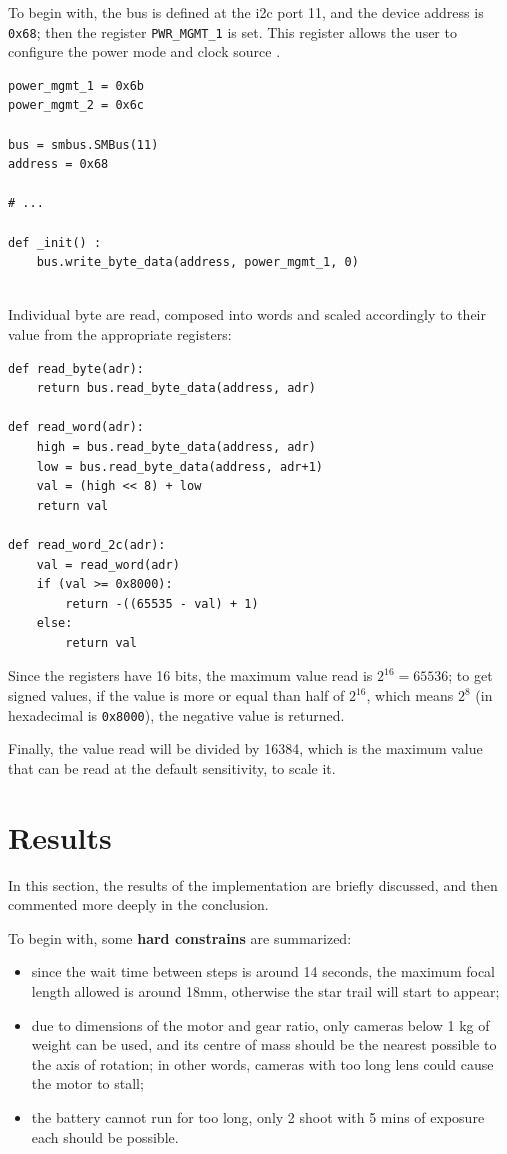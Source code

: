 \documentclass[]{article}
\begin{document}
To begin with, the bus is defined at the i2c port 11, and the device address is \texttt{0x68}; then the register \texttt{PWR\_MGMT\_1} is set. This register allows the user to configure the power mode and clock source \cite{sparkfun}.

\begin{lstlisting}[language=PythonPlus, caption=Sensor initialization.]
power_mgmt_1 = 0x6b
power_mgmt_2 = 0x6c

bus = smbus.SMBus(11)
address = 0x68       
	
# ...
	
def _init() :
	bus.write_byte_data(address, power_mgmt_1, 0)
	
\end{lstlisting}

Individual byte are read, composed into words and scaled accordingly to their value from the appropriate registers:

\begin{lstlisting}[language=PythonPlus, caption=A word is a two byte value read from a register.]
def read_byte(adr):
	return bus.read_byte_data(address, adr)

def read_word(adr):
	high = bus.read_byte_data(address, adr)
	low = bus.read_byte_data(address, adr+1)
	val = (high << 8) + low
	return val

def read_word_2c(adr):
	val = read_word(adr)
	if (val >= 0x8000):
		return -((65535 - val) + 1)
	else:
		return val
\end{lstlisting}

Since the registers have 16 bits, the maximum value read is $2^{16} = 65536$; to get signed values, if the value is more or equal than half of $2^{16}$, which means $2^8$ (in hexadecimal is \texttt{0x8000}), the negative value is returned. 

Finally, the value read will be divided by 16384, which is the maximum value that can be read at the default sensitivity, to scale it. 

\section{Results}
In this section, the results of the implementation are briefly discussed, and then commented more deeply in the conclusion. 

To begin with, some \textbf{hard constrains} are summarized:

\begin{itemize}
	\item since the wait time between steps is around 14 seconds, the maximum focal length allowed is around 18mm, otherwise the star trail will start to appear;
	\item due to dimensions of the motor and gear ratio, only cameras below 1 kg of weight can be used, and its centre of mass should be the nearest possible to the axis of rotation; in other words, cameras with too long lens could cause the motor to stall;
	\item the battery cannot run for too long, only 2 shoot with 5 mins of exposure each should be possible. 
\end{itemize}
\end{document}
